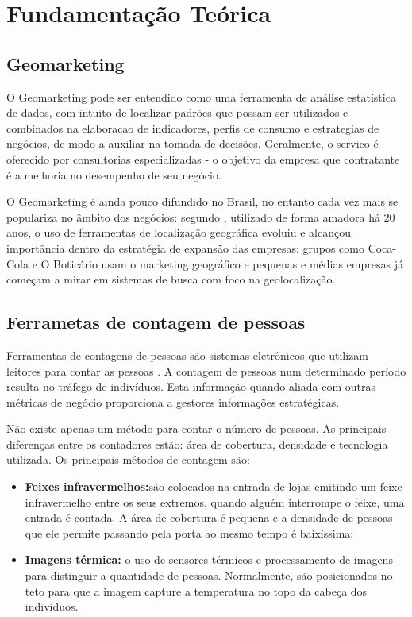 
\chapter{Fundamentação Teórica}
\label{fundamentacao-teorica}

\section{Geomarketing}
O Geomarketing pode ser entendido como uma ferramenta de análise estatística de dados, com intuito de localizar padrões que possam ser utilizados e combinados na elaboracao de indicadores, perfis de consumo e estrategias de negócios, de modo a auxiliar na tomada de decisões. Geralmente, o servico é oferecido por consultorias especializadas - o  objetivo da empresa que contratante é a melhoria no desempenho de seu negócio.

O Geomarketing é ainda pouco difundido no Brasil, no entanto cada vez mais se populariza no âmbito dos negócios: segundo \cite{Exame}, utilizado de forma amadora há 20 anos, o uso de ferramentas de localização geográfica evoluiu e alcançou importância dentro da estratégia de expansão das empresas: grupos como Coca-Cola e O Boticário usam o marketing geográfico e pequenas e médias empresas já começam a mirar em sistemas de busca com foco na geolocalização.

\section{Ferrametas de contagem de pessoas}
Ferramentas de contagens de pessoas são sistemas eletrônicos que utilizam leitores para contar as pessoas \cite{trafsysdef}. A contagem de pessoas
num determinado período resulta no tráfego de indivíduos. Esta informação quando aliada com outras métricas de negócio proporciona a gestores
informações estratégicas.

Não existe apenas um método para contar o número de pessoas. As principais diferenças entre os contadores estão: área de cobertura, densidade e tecnologia utilizada. Os principais
métodos de contagem são:
\begin{itemize}
  \item \textbf{Feixes infravermelhos:}são colocados na entrada de lojas emitindo um feixe infravermelho entre os seus extremos, quando
  alguém interrompe o feixe, uma entrada é contada. A área de cobertura é pequena e a densidade de pessoas que ele permite passando pela porta
  ao mesmo tempo é baixíssima;
  \item \textbf{Imagens térmica:} o uso de sensores térmicos e processamento de imagens para distinguir a quantidade de pessoas. Normalmente, são
  posicionados no teto para que a imagem capture a temperatura no topo da cabeça dos indivíduos.
\end{itemize}




